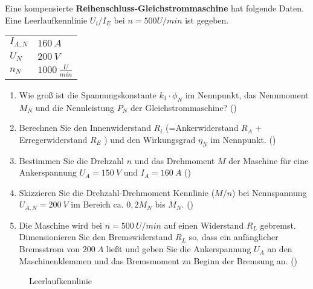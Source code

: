 \begin{question}[section=2,name={18.1.2017},mode=exm,type=bsp,tags={20170118}]
	Eine kompensierte \textbf{Reihenschluss-Gleichstrommaschine} hat folgende Daten. Eine Leerlaufkennlinie $U_i/I_E$ bei $n=500 U/min$ ist gegeben.\\
	\begin{tabular}{L{2cm}l}
		$I_{A,N}$ \dotfill &$160~A$\\
		$U_{N}$ \dotfill & $200~V$ \\
		$n_N$ \dotfill & $1000~\frac{U}{min}$\\
	\end{tabular}
	\begin{enumerate}
		\item Wie groß ist die Spannungskonstante $k_1 \cdot \phi_N$ im Nennpunkt, das Nennmoment $M_N$ und die Nennleistung $P_N$ der Gleichstrommaschine? ()
		\item Berechnen Sie den Innenwiderstand $R_i$ (=Ankerwiderstand $R_A$ + Erregerwiderstand $R_E$ ) und den Wirkungsgrad $\eta_N$ im Nennpunkt. ()
		\item Bestimmen Sie die Drehzahl $n$ und das Drehmoment $M$ der Maschine für eine Ankerspannung $U_A =150~V$ und $I_A = 160~A$ ()
		\item Skizzieren Sie die Drehzahl-Drehmoment Kennlinie ($M/n$) bei Nennspannung $U_{A,N}=200~V$ im Bereich ca. $0,2M_N$ bis $M_N$. ()
		\item Die Maschine wird bei $n=500~U/min$ auf einen Widerstand $R_L$ gebremst. Dimensionieren Sie den Bremswiderstand $R_L$ so, dass ein anfänglicher Bremsstrom von $200~A$ ließt und geben Sie die Ankerspannung $U_A$ an den Maschinenklemmen und das Bremsmoment zu Beginn der Bremsung an. ()
	\end{enumerate}
	\begin{figure}[H]
		\caption{Leerlaufkennlinie} \label{fig:20170118}
	\end{figure}
\end{question}
\begin{solution}
	
\end{solution}